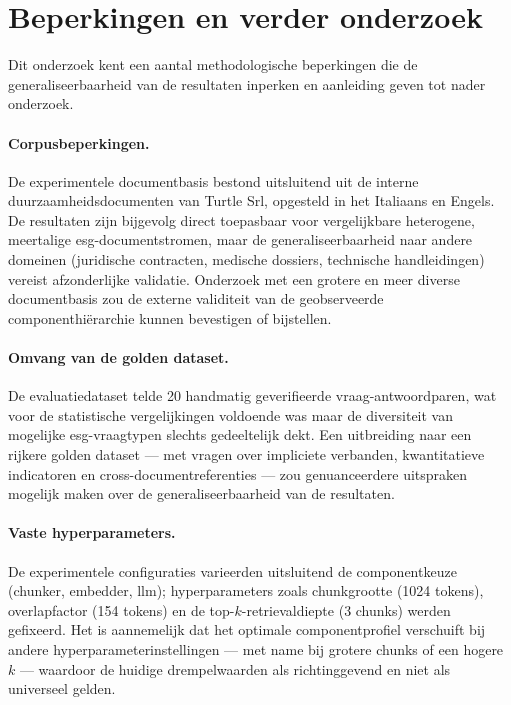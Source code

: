 \section{Beperkingen en verder onderzoek}
\label{sec:beperkingen}

Dit onderzoek kent een aantal methodologische beperkingen die de generaliseerbaarheid van de resultaten inperken en aanleiding geven tot nader onderzoek.

\paragraph{Corpusbeperkingen.}
De experimentele documentbasis bestond uitsluitend uit de interne duurzaamheidsdocumenten van Turtle Srl, opgesteld in het Italiaans en Engels. De resultaten zijn bijgevolg direct toepasbaar voor vergelijkbare heterogene, meertalige \gls{esg}-documentstromen, maar de generaliseerbaarheid naar andere domeinen (juridische contracten, medische dossiers, technische handleidingen) vereist afzonderlijke validatie. Onderzoek met een grotere en meer diverse documentbasis zou de externe validiteit van de geobserveerde componenthiërarchie kunnen bevestigen of bijstellen.

\paragraph{Omvang van de golden dataset.}
De evaluatiedataset telde 20 handmatig geverifieerde vraag-antwoordparen, wat voor de statistische vergelijkingen voldoende was maar de diversiteit van mogelijke \gls{esg}-vraagtypen slechts gedeeltelijk dekt. Een uitbreiding naar een rijkere golden dataset — met vragen over impliciete verbanden, kwantitatieve indicatoren en cross-documentreferenties — zou genuanceerdere uitspraken mogelijk maken over de generaliseerbaarheid van de resultaten.

\paragraph{Vaste hyperparameters.}
De experimentele configuraties varieerden uitsluitend de componentkeuze (chunker, embedder, \gls{llm}); hyperparameters zoals chunkgrootte (1024 tokens), overlapfactor (154 tokens) en de top-$k$-retrievaldiepte (3 chunks) werden gefixeerd. Het is aannemelijk dat het optimale componentprofiel verschuift bij andere hyperparameterinstellingen — met name bij grotere chunks of een hogere $k$ — waardoor de huidige drempelwaarden als richtinggevend en niet als universeel gelden.

